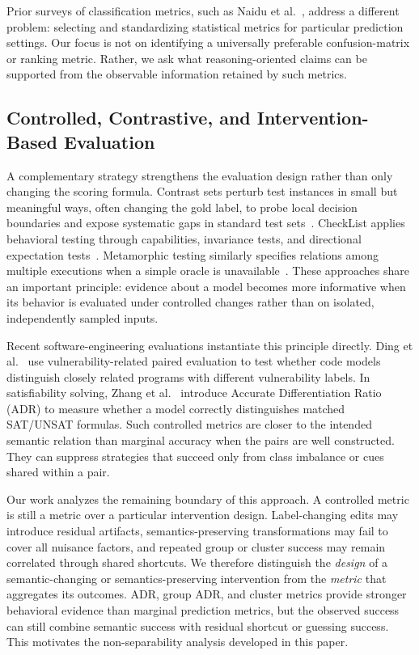\documentclass[acmsmall,screen,review,anonymous]{acmart}
\begin{document}
Prior surveys of classification metrics, such as Naidu et
al.~\cite{Naidu2023ReviewMetrics}, address a different problem: selecting and
standardizing statistical metrics for particular prediction settings. Our
focus is not on identifying a universally preferable confusion-matrix or
ranking metric. Rather, we ask what reasoning-oriented claims can be supported
from the observable information retained by such metrics.


\subsection{Controlled, Contrastive, and Intervention-Based Evaluation}
\label{sec:rw-controlled}

A complementary strategy strengthens the evaluation design rather than only
changing the scoring formula. Contrast sets perturb test instances in small
but meaningful ways, often changing the gold label, to probe local decision
boundaries and expose systematic gaps in standard test
sets~\cite{Gardner2020ContrastSets}. CheckList applies behavioral testing
through capabilities, invariance tests, and directional expectation
tests~\cite{Ribeiro2020CheckList}. Metamorphic testing similarly specifies
relations among multiple executions when a simple oracle is
unavailable~\cite{Chen2018MetamorphicSurvey}. These approaches share an
important principle: evidence about a model becomes more informative when its
behavior is evaluated under controlled changes rather than on isolated,
independently sampled inputs.

Recent software-engineering evaluations instantiate this principle directly.
Ding et al.~\cite{VDCL:Ding:2024} use vulnerability-related paired evaluation
to test whether code models distinguish closely related programs with
different vulnerability labels. In satisfiability solving, Zhang et
al.~\cite{Zhang2026SAT} introduce Accurate Differentiation Ratio (ADR) to
measure whether a model correctly distinguishes matched SAT/UNSAT formulas.
Such controlled metrics are closer to the intended semantic relation than
marginal accuracy when the pairs are well constructed. They can suppress
strategies that succeed only from class imbalance or cues shared within a
pair.

Our work analyzes the remaining boundary of this approach. A controlled
metric is still a metric over a particular intervention design. Label-changing
edits may introduce residual artifacts, semantics-preserving transformations
may fail to cover all nuisance factors, and repeated group or cluster success
may remain correlated through shared shortcuts. We therefore distinguish the
\emph{design} of a semantic-changing or semantics-preserving intervention from
the \emph{metric} that aggregates its outcomes. ADR, group ADR, and cluster
metrics provide stronger behavioral evidence than marginal prediction
metrics, but the observed success can still combine semantic success with
residual shortcut or guessing success. This motivates the non-separability
analysis developed in this paper.
\end{document}
